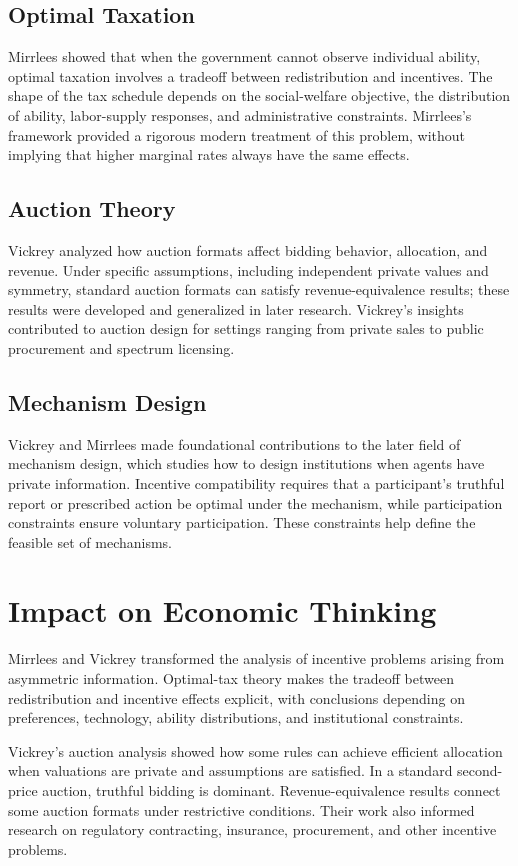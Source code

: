 \subsection*{Optimal Taxation}
Mirrlees showed that when the government cannot observe individual ability,
optimal taxation involves a tradeoff between redistribution and incentives.
The shape of the tax schedule depends on the social-welfare objective, the
distribution of ability, labor-supply responses, and administrative constraints.
Mirrlees's framework provided a rigorous modern treatment of this problem,
without implying that higher marginal rates always have the same effects.

\subsection*{Auction Theory}
Vickrey analyzed how auction formats affect bidding behavior, allocation, and
revenue. Under specific assumptions, including independent private values and
symmetry, standard auction formats can satisfy revenue-equivalence results;
these results were developed and generalized in later research. Vickrey's
insights contributed to auction design for settings ranging from private sales
to public procurement and spectrum licensing.

\subsection*{Mechanism Design}
Vickrey and Mirrlees made foundational contributions to the later field of
mechanism design, which studies how to design institutions when agents have
private information. Incentive compatibility requires that a participant's
truthful report or prescribed action be optimal under the mechanism, while
participation constraints ensure voluntary participation. These constraints
help define the feasible set of mechanisms.

\section{Impact on Economic Thinking}
Mirrlees and Vickrey transformed the analysis of incentive problems arising
from asymmetric information. Optimal-tax theory makes the tradeoff between
redistribution and incentive effects explicit, with conclusions depending on
preferences, technology, ability distributions, and institutional constraints.

Vickrey's auction analysis showed how some rules can achieve efficient
allocation when valuations are private and assumptions are satisfied. In a
standard second-price auction, truthful bidding is dominant. Revenue-equivalence
results connect some auction formats under restrictive conditions. Their work
also informed research on regulatory contracting, insurance, procurement, and
other incentive problems.


